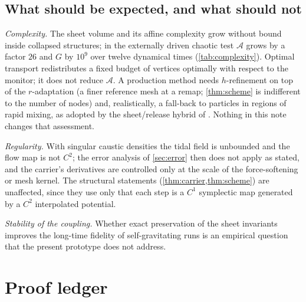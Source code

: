 \subsection{What should be expected, and what should not}

\emph{Complexity.} The sheet volume and its affine complexity grow without bound inside collapsed structures;
in the externally driven chaotic test $\mathcal A$ grows by a factor $26$ and $G$ by $10^{9}$ over twelve dynamical
times (\cref{tab:complexity}). Optimal transport redistributes a fixed budget of vertices optimally with respect to
the monitor; it does not reduce $\mathcal A$. A production method needs $h$-refinement on top of the
$r$-adaptation (a finer reference mesh at a remap; \cref{thm:scheme} is indifferent to the number of nodes) and,
realistically, a fall-back to particles in regions of rapid mixing, as adopted by the sheet/release hybrid of
\cite{Stuecker2020}. Nothing in this note changes that assessment.

\emph{Regularity.} With singular caustic densities the tidal field is unbounded and the flow map is not $C^2$; the
error analysis of \cref{sec:error} then does not apply as stated, and the carrier's derivatives are controlled only
at the scale of the force-softening or mesh kernel. The structural statements (\cref{thm:carrier,thm:scheme}) are
unaffected, since they use only that each step is a $C^1$ symplectic map generated by a $C^2$ interpolated potential.

\emph{Stability of the coupling.} Whether exact preservation of the sheet invariants improves the long-time
fidelity of self-gravitating runs is an empirical question that the present prototype does not address.

\section{Proof ledger}\label{sec:ledger}

